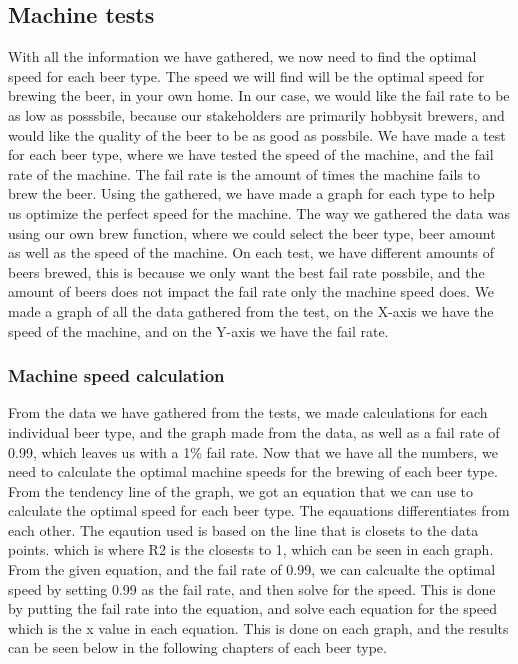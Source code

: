 \subsection{Machine tests}
With all the information we have gathered, we now need to find the optimal speed for each beer type. The speed we will find will be the optimal speed for brewing the beer, in your own home. In our case,
we would like the fail rate to be as low as posssbile, because our stakeholders are primarily hobbysit brewers, and would like the quality of the beer to be as good as possbile.
We have made a test for each beer type, where we have tested the speed of the machine, and the fail rate of the machine. The fail rate is the amount of times the machine fails to brew the beer.
Using the gathered, we have made a graph for each type to help us optimize the perfect speed for the machine. \newline
The way we gathered the data was using our own brew function, where we could select the beer type, beer amount as well as the speed of the machine. On each test, we have different amounts of beers brewed, this is because we only want the best fail rate possbile, and the amount of beers does not impact the fail rate only the machine speed does.
We made a graph of all the data gathered from the test, on the X-axis we have the speed of the machine, and on the Y-axis we have the fail rate. \newline

\subsubsection{Machine speed calculation}
From the data we have gathered from the tests, we made calculations for each individual beer type, and the graph made from the data, as well as a fail rate of 0.99, 
which leaves us with a 1\% fail rate. Now that we have all the numbers, we need to calculate the optimal machine speeds for the brewing of each beer type. \newline
From the tendency line of the graph, we got an equation that we can use to calculate the optimal speed for each beer type. The eqauations differentiates from each other. The eqaution used is based on the line that is closets to the data points. which is where R2 is the closests to 1, which can be seen in each graph. \newline
From the given equation, and the fail rate of 0.99, we can calcualte the optimal speed by setting 0.99 as the fail rate, and then solve for the speed. This is done by putting the fail rate into the equation, and solve each equation for the speed which is the x value in each equation. \newline
This is done on each graph, and the results can be seen below in the following chapters of each beer type. \newline



